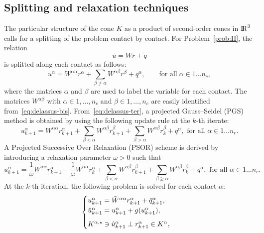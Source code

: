 \subsection{Splitting and relaxation techniques}
\label{Sec:SplittingTechniques}
 The particular structure of the cone $K$ as a product of second-order cones in $\mathrm{I\!R}^3$
 calls for a splitting of the problem contact by contact.
For Problem~\ref{prob:II}, the relation
\begin{equation}
  \label{eq:delassus-bis}
  u = W r+q
\end{equation}
is splitted along each contact as follows:
\begin{equation}
  \label{eq:delassus-ter}
  u^\alpha = W^{\alpha\alpha} r^\alpha + \sum_{\beta\neq \alpha}W^{\alpha\beta} r^\beta +  q^\alpha, \qquad\text{for all}\; \alpha \in 1\ldots n_c,
\end{equation}
where the matrices $\alpha$ and $\beta$ are used to label the variable for each contact.
 The matrices $W^{\alpha\beta}$ with $\alpha \in 1,\ldots, n_c$ and $\beta \in 1,\ldots, n_c $ are easily identified from~\eqref{eq:delassus-bis}.
 From~\eqref{eq:delassus-ter}, a projected Gauss--Seidel (PGS) method is obtained by using the following update rule at the $k$-th iterate:
\begin{equation}
  \label{eq:pgs-1}
  u^{\alpha}_{k+1} = W^{\alpha\alpha} r^{\alpha}_{k+1} + \sum_{\beta < \alpha}W^{\alpha\beta} r^{\beta}_{k+1} + \sum_{\beta > \alpha}W^{\alpha\beta} r^{\beta}_{k} +  q^\alpha, \text{ for all } \alpha \in 1\ldots n_c.
\end{equation}
A Projected Successive Over Relaxation (PSOR) scheme is derived by introducing a relaxation parameter $\omega>0$ such that
\begin{equation}
  \label{eq:psor-1}
  u^{\alpha}_{k+1} = \frac 1 \omega W^{\alpha\alpha} r^{\alpha}_{k+1} 
  - \frac 1 \omega W^{\alpha\alpha} r^{\alpha}_{k} +
  \sum_{\beta < \alpha}W^{\alpha\beta} r^{\beta}_{k+1} + \sum_{\beta \geq \alpha}W^{\alpha\beta} r^{\beta}_{k} +  q^\alpha, \text{ for all } \alpha \in 1\ldots n_c.
\end{equation}
At the $k$-th iteration, the following problem is solved for each contact $\alpha$:
\begin{equation}\label{eq:psor-3}
  \begin{cases}
    u^{\alpha}_{k+1} =  \Bar W^{\alpha\alpha}  r^{\alpha}_{k+1} + \bar q^{\alpha}_{k+1}, \\
    \hat u^{\alpha}_{k+1} =u^{\alpha}_{k+1} + g(u^{\alpha}_{k+1}), \\[2mm]
    K^{\alpha,\star} \ni {\hat u^{\alpha}_{k+1}} \perp r^{\alpha}_{k+1} \in K^\alpha,
  \end{cases}
\end{equation}
